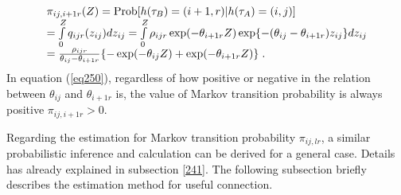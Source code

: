 \begin{eqnarray}
\begin{array}{l}
 \pi _{ij,i + 1r} (Z) = {\rm{Prob}}[h(\tau _B ) = (i + 1,r)|h(\tau _A ) = (i,j)] \\ 
  = \int\limits_0^Z {q_{ijr} (z_{ij} )dz_{ij} }  = \int\limits_0^Z {\rho _{ijr} \exp ( - \theta _{i + 1r} Z)\exp \{  - (\theta _{ij}  - \theta _{i + 1r} )z_{ij} \} dz_{ij} }  \\ 
  = \frac{{\rho _{ijr} }}{{\theta _{ij}  - \theta _{i + 1r} }}\{  - \exp ( - \theta _{ij} Z) + \exp ( - \theta _{i + 1r} Z)\}  \hspace{1mm}.\\ 
 \end{array} \label{eq250}
\end{eqnarray}
In equation (\ref{eq250}), regardless of how positive or negative in the relation between $\theta_{ij}$ and $\theta_{i+1r}$ is, the value of Markov transition probability is always positive $ \pi_{ij,i+1r} > 0$.

Regarding the estimation for Markov transition probability $\pi_{ij,lr}$, a similar probabilistic inference and calculation can be derived for a general case. Details has already explained in subsection \ref{241}. The following subsection briefly describes the estimation method for useful connection.
